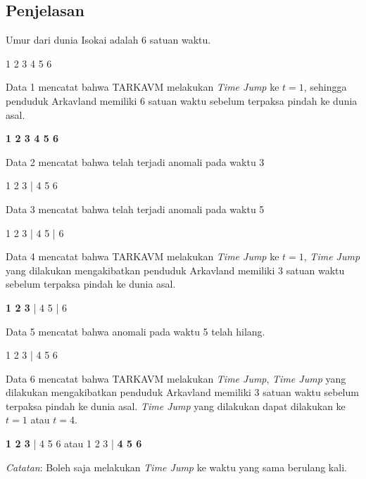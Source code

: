 \documentclass{article}
\begin{document}
\subsection*{Penjelasan}
Umur dari dunia Isokai adalah 6 satuan waktu.

1 2 3 4 5 6


Data 1 mencatat bahwa TARKAVM melakukan \textit{Time Jump} ke $t = 1$, sehingga penduduk Arkavland memiliki 6 satuan waktu sebelum terpaksa pindah ke dunia asal.

\textbf{1 2 3 4 5 6}

Data 2 mencatat bahwa telah terjadi anomali pada waktu 3

1 2 3 | 4 5 6

Data 3 mencatat bahwa telah terjadi anomali pada waktu 5

1 2 3 | 4 5 | 6

Data 4 mencatat bahwa TARKAVM melakukan \textit{Time Jump} ke $t = 1$, \textit{Time Jump} yang dilakukan mengakibatkan penduduk Arkavland memiliki 3 satuan waktu sebelum terpaksa pindah ke dunia asal.

\textbf{1 2 3} | 4 5 | 6

Data 5 mencatat bahwa anomali pada waktu 5 telah hilang.

1 2 3 | 4 5 6

Data 6 mencatat bahwa TARKAVM melakukan \textit{Time Jump}, \textit{Time Jump} yang dilakukan mengakibatkan penduduk Arkavland memiliki 3 satuan waktu sebelum terpaksa pindah ke dunia asal.
\textit{Time Jump} yang dilakukan dapat dilakukan ke $t = 1$ atau $t = 4$.

\textbf{1 2 3} | 4 5 6
atau
1 2 3 | \textbf{4 5 6}

\textit{Catatan}: Boleh saja melakukan \textit{Time Jump} ke waktu yang sama berulang kali.

\pagebreak
\end{document}
